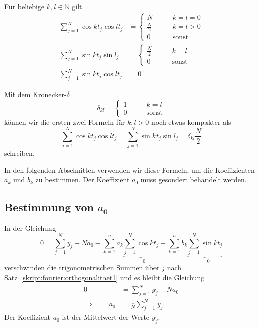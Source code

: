\begin{satz}
\label{skript:fourier:satzprodukte}
Für beliebige $k,l\in \mathbb N$ gilt
\begin{align*}
\sum_{j=1}^N
\cos kt_j \cos lt_j
&=
\begin{cases}
N                     &\qquad k=l=0\\
\displaystyle\frac{N}2&\qquad k=l > 0\\
0                     &\qquad\text{sonst}
\end{cases}
\\
\sum_{j=1}^N
\sin kt_j \sin l_j
&=
\begin{cases}
\displaystyle \frac{N}2&\qquad k=l\\
0                      &\qquad\text{sonst}
\end{cases}
\\
\sum_{j=1}^N
\sin kt_j \cos lt_j
&=
0
\end{align*}
\end{satz}
Mit dem Kronecker-$\delta$ 
%
\[
\delta_{kl}
=
\begin{cases}
1&\qquad k=l\\
0&\qquad\text{sonst}
\end{cases}
\]
können wir die ersten zwei Formeln für $k,l>0$ noch etwas kompakter 
als
\begin{equation}
\sum_{j=1}^N
\cos kt_j \cos lt_j
=
\sum_{j=1}^N
\sin kt_j \sin l_j
=
\delta_{kl}\frac{N}2
\label{skript:fourier:trigsumsummary}
\end{equation}
schreiben.

In den folgenden Abschnitten verwenden wir diese Formeln, um die
Koeffizienten $a_k$ und $b_k$ zu bestimmen.
Der Koeffizient $a_0$ muss gesondert behandelt werden.

\subsection{Bestimmung von $a_0$}
In der Gleichung
\[
0
=
\sum_{j=1}^Ny_j
-Na_0
-\sum_{k=1}^na_k\underbrace{\sum_{j=1}^N\cos kt_j}_{\displaystyle=0}
-\sum_{k=1}^nb_k\underbrace{\sum_{j=1}^N\sin kt_j}_{\displaystyle=0}
\]
verschwinden die trigonometrischen Summen über $j$ nach
Satz~\ref{skript:fourier:orthogonalitaet1} und es bleibt die Gleichung
\begin{align*}
0
&=
\sum_{j=1}^Ny_j
-Na_0
\\
\Rightarrow\qquad
a_0&=\frac1{N}\sum_{j=1}^N y_j.
\end{align*}
Der Koeffizient $a_0$ ist der Mittelwert der Werte $y_j$.

